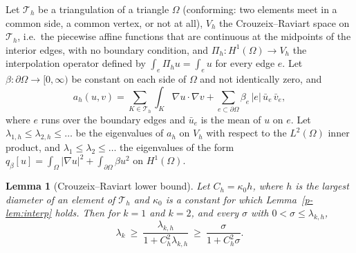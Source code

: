 \documentclass[11pt]{article}
\newtheorem{lemma}[theorem]{Lemma}
\theoremstyle{remark}
\begin{document}
Let $\mathcal T_h$ be a triangulation of a triangle $\Omega$ (conforming: two elements meet in a
common side, a common vertex, or not at all), $V_h$ the Crouzeix--Raviart space \cite{CR} on
$\mathcal T_h$, i.e.\ the piecewise affine functions that are continuous at the midpoints of the
interior edges, with no boundary condition, and $\Pi_h:H^1(\Omega)\to V_h$ the interpolation
operator defined by $\int_e\Pi_hu=\int_eu$ for every edge $e$. Let
$\beta:\partial\Omega\to[0,\infty)$ be constant on each side of $\Omega$ and not identically
zero, and
\[
  a_h(u,v)=\sum_{K\in\mathcal T_h}\int_K\nabla u\cdot\nabla v
  +\sum_{e\subset\partial\Omega}\beta_e\,|e|\,\bar u_e\,\bar v_e ,
\]
where $e$ runs over the boundary edges and $\bar u_e$ is the mean of $u$ on $e$. Let
$\lambda_{1,h}\le\lambda_{2,h}\le\dots$ be the eigenvalues of $a_h$ on $V_h$ with respect to the
$L^2(\Omega)$ inner product, and $\lambda_1\le\lambda_2\le\dots$ the eigenvalues of the form
$q_\beta[u]=\int_\Omega|\nabla u|^2+\int_{\partial\Omega}\beta u^2$ on $H^1(\Omega)$.

\begin{lemma}[Crouzeix--Raviart lower bound]\label{p-lem:CR}
Let $C_h=\kappa_0h$, where $h$ is the largest diameter of an element of $\mathcal T_h$ and
$\kappa_0$ is a constant for which Lemma~\ref{p-lem:interp} holds. Then for $k=1$ and $k=2$,
and every $\sigma$ with $0<\sigma\le\lambda_{k,h}$,
\[
  \lambda_k\ \ge\ \frac{\lambda_{k,h}}{1+C_h^2\lambda_{k,h}}\ \ge\ \frac{\sigma}{1+C_h^2\sigma}.
\]
\end{lemma}
\end{document}
